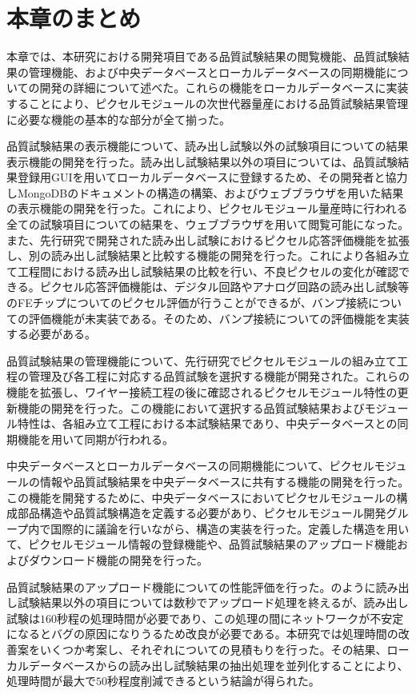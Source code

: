 \section{本章のまとめ}
\label{sec:summary7}

本章では、本研究における開発項目である品質試験結果の閲覧機能、品質試験結果の管理機能、および中央データベースとローカルデータベースの同期機能についての開発の詳細について述べた。これらの機能をローカルデータベースに実装することにより、ピクセルモジュールの次世代器量産における品質試験結果管理に必要な機能の基本的な部分が全て揃った。

品質試験結果の表示機能について、読み出し試験以外の試験項目についての結果表示機能の開発を行った。読み出し試験結果以外の項目については、品質試験結果登録用GUIを用いてローカルデータベースに登録するため、その開発者と協力しMongoDBのドキュメントの構造の構築、およびウェブブラウザを用いた結果の表示機能の開発を行った。これにより、ピクセルモジュール量産時に行われる全ての試験項目についての結果を、ウェブブラウザを用いて閲覧可能になった。
また、先行研究で開発された読み出し試験におけるピクセル応答評価機能を拡張し、別の読み出し試験結果と比較する機能の開発を行った。これにより各組み立て工程間における読み出し試験結果の比較を行い、不良ピクセルの変化が確認できる。ピクセル応答評価機能は、デジタル回路やアナログ回路の読み出し試験等のFEチップについてのピクセル評価が行うことができるが、バンプ接続についての評価機能が未実装である。そのため、バンプ接続についての評価機能を実装する必要がある。

品質試験結果の管理機能について、先行研究でピクセルモジュールの組み立て工程の管理及び各工程に対応する品質試験を選択する機能が開発された。これらの機能を拡張し、ワイヤー接続工程の後に確認されるピクセルモジュール特性の更新機能の開発を行った。この機能において選択する品質試験結果およびモジュール特性は、各組み立て工程における本試験結果であり、中央データベースとの同期機能を用いて同期が行われる。

中央データベースとローカルデータベースの同期機能について、ピクセルモジュールの情報や品質試験結果を中央データベースに共有する機能の開発を行った。この機能を開発するために、中央データベースにおいてピクセルモジュールの構成部品構造や品質試験構造を定義する必要があり、ピクセルモジュール開発グループ内で国際的に議論を行いながら、構造の実装を行った。定義した構造を用いて、ピクセルモジュール情報の登録機能や、品質試験結果のアップロード機能およびダウンロード機能の開発を行った。

品質試験結果のアップロード機能についての性能評価を行った。のように読み出し試験結果以外の項目については数秒でアップロード処理を終えるが、読み出し試験は$160$秒程の処理時間が必要であり、この処理の間にネットワークが不安定になるとバグの原因になりうるため改良が必要である。本研究では処理時間の改善案をいくつか考案し、それぞれについての見積もりを行った。その結果、ローカルデータベースからの読み出し試験結果の抽出処理を並列化することにより、処理時間が最大で$50$秒程度削減できるという結論が得られた。





\newpage
